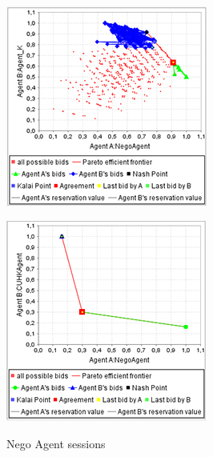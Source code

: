 \documentclass[html]{report}    %
\begin{document}
\begin{figure}
\begin{minipage}{.3\textwidth}
  \label{fig:6}
\end{minipage}\\
\begin{minipage}{.3\textwidth}
  \centering
  \includegraphics[width=.9\linewidth]{7}
  \label{fig:7}
\end{minipage}
\begin{minipage}{.3\textwidth}
  \centering
  \includegraphics[width=.9\linewidth]{8}
  \label{fig:8}
\end{minipage}
\caption{Nego Agent sessions}
\label{sessionGraphs}
\end{figure}
\end{document}

